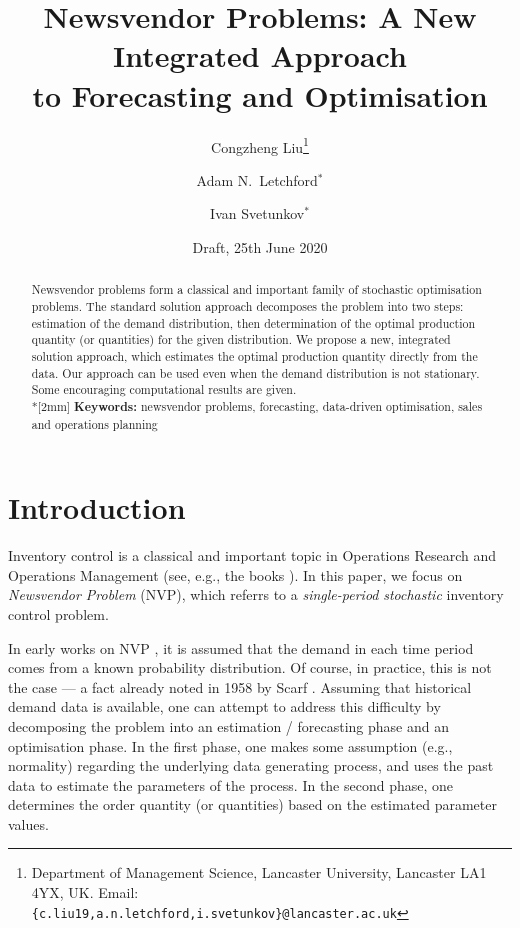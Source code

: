 \documentclass{article}
\title{Newsvendor Problems: A New Integrated Approach\\ to Forecasting and Optimisation}
\author{Congzheng Liu\thanks{Department of Management Science,
Lancaster University, Lancaster LA1 4YX, UK.
Email: {\tt \{c.liu19,a.n.letchford,i.svetunkov\}@lancaster.ac.uk}}
\and Adam N.\ Letchford$^*$ \and Ivan Svetunkov$^*$} %
\date{Draft, 25th June 2020}
\begin{document}
\maketitle

\begin{abstract}
Newsvendor problems form a classical and important family of stochastic optimisation problems. The standard solution approach decomposes the problem into two steps: estimation of the demand distribution, then determination of the optimal production quantity (or quantities) for the given distribution. We propose a new, integrated solution approach, which estimates the optimal production quantity directly from the data. Our approach can be used even when the demand distribution is not stationary. Some encouraging computational results are given. 
\\*[2mm]
{\bf Keywords:} newsvendor problems, forecasting, data-driven optimisation, sales and operations planning
\end{abstract}


\section{Introduction}

Inventory control is a classical and important topic in Operations Research and Operations Management (see, e.g., the books \cite{Po02,SPP98,Zi00}). In this paper, we focus on \emph{Newsvendor Problem} (NVP), which referrs to a \emph{single-period} \emph{stochastic} inventory control problem.

In early works on NVP \cite{AHM51,MK51}, it is assumed that the demand in each time period comes from a known probability distribution. Of course, in practice, this is not the case --- a fact already noted in 1958 by Scarf \cite{Sc58}. Assuming that historical demand data is available, one can attempt to address this difficulty by decomposing the problem into an estimation / forecasting phase and an optimisation phase.
In the first phase, one makes some assumption (e.g., normality) regarding the underlying data generating process, and uses the past data to estimate the parameters of the process.
In the second phase, one determines the order quantity (or quantities) based on the estimated parameter values.
\end{document}
